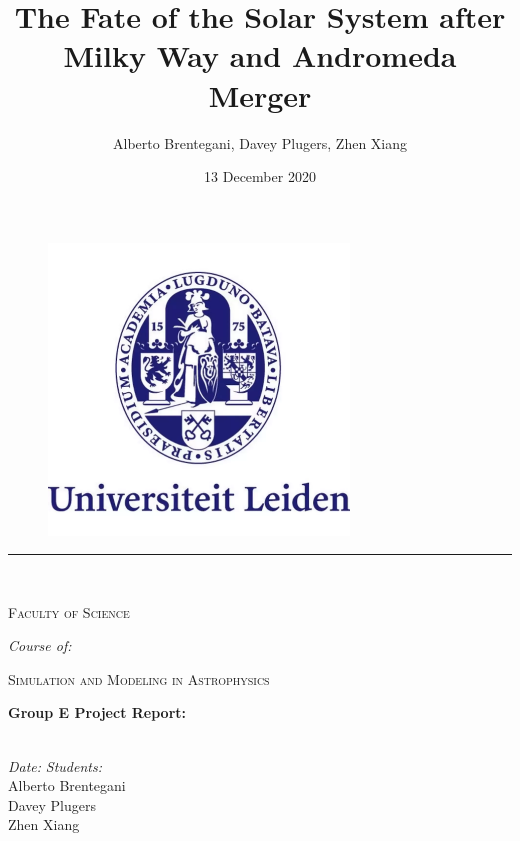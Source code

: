 \documentclass[a4paper,12pt, english]{article}
\title{The Fate of the Solar System after Milky Way and Andromeda Merger}
\author{Alberto Brentegani, Davey Plugers, Zhen Xiang}
\date{13 December 2020}
\begin{document}

\begin{titlepage}
\makeatletter
\begin{center}

\vspace*{-1in}
\begin{figure}[htb]
    \centering
    \includegraphics[width=8cm]{lu_logo.png}
\end{figure}

\vspace{-25pt}
\rule{125mm}{0.1mm} \\
\vspace{5pt}
\begin{Large}
    \textsc{Faculty of Science}\\
\end{Large}
\vspace{5pt}
\textit{Course of:}\\

\begin{Large}
    \textsc{Simulation and Modeling in Astrophysics}\\
\end{Large}
\vspace{30pt}

\begin{LARGE}
    \textbf{Group E Project Report:} \\
    \textbf{\@title} \\
\end{LARGE}
\vfill

\begin{normalsize}
	\begin{flushleft}
	  \textit{Date:} \hfill \textit{Students:}\\
	  \vspace{1pt}
	  \@date \hfill Alberto Brentegani\\
	  \hfill Davey Plugers\\
	  \hfill Zhen Xiang\\
	  \vspace{10pt}
	\end{flushleft}
\end{normalsize}
\vspace{20pt}


\end{center}
\end{titlepage}
\end{document}
